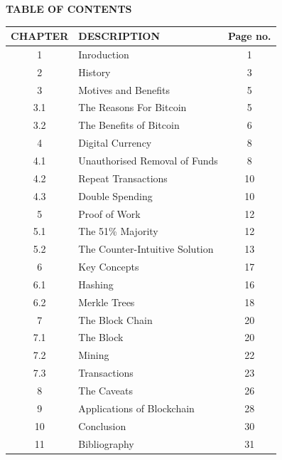 \documentclass[12pt,a4paper]{report}
\newcommand{\blank}[1]{\hspace*{#1}}
\begin{document}
\begin{justify}

\newpage

\begin{center}\Large\textbf{TABLE OF CONTENTS}\end{center}
\vspace{10mm}

\begin{tabular}{|c |l| c|}\hline
\textbf{CHAPTER} & DESCRIPTION\blank{7cm} & \textbf{Page no.}\\ \hline
1 & Inroduction & 1\\ \hline
2 & History &3\\ \hline
3 & Motives and Benefits & 5\\ \hline
3.1 &  The Reasons For Bitcoin &5\\ \hline
3.2 &  The Benefits of Bitcoin & 6\\ \hline
4 &  Digital Currency & 8\\ \hline
4.1 &  Unauthorised Removal of Funds & 8\\ \hline
4.2 & Repeat Transactions & 10\\ \hline
4.3 & Double Spending & 10 \\ \hline
5 & Proof of Work & 12\\ \hline
5.1 & The 51\% Majority & 12\\ \hline
5.2 & The Counter-Intuitive Solution & 13\\ \hline
6 & Key Concepts & 17\\ \hline

6.1 & Hashing & 16 \\ \hline
6.2 & Merkle Trees & 18 \\ \hline
7 & The Block Chain & 20 \\ \hline
7.1 & The Block & 20 \\ \hline
7.2 & Mining & 22 \\ \hline
7.3 & Transactions & 23 \\ \hline
8 & The Caveats & 26 \\ \hline
9 & Applications of Blockchain & 28 \\ \hline
10 & Conclusion & 30 \\ \hline
11 & Bibliography & 31 \\ \hline
\end{tabular}


\end{justify}
\end{document}
